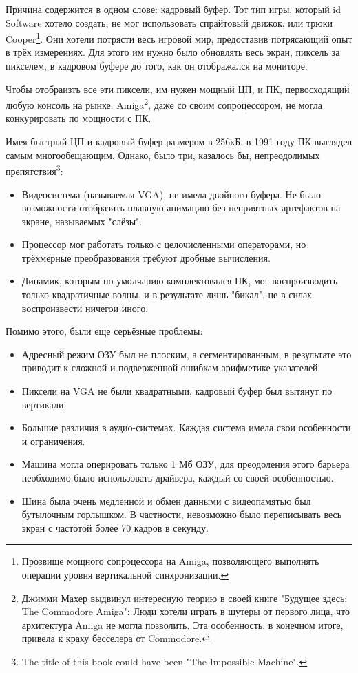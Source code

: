 Причина содержится в одном слове: кадровый буфер. Тот тип игры, который id Software хотело создать, не мог использовать спрайтовый движок, или трюки Cooper\footnote{Прозвище мощного сопроцессора на Amiga, позволяющего выполнять операции уровня вертикальной синхронизации.}. Они хотели потрясти весь игровой мир, предоставив потрясающий опыт в трёх измерениях. Для этого им нужно было обновлять весь экран, пиксель за пикселем, в кадровом буфере до того, как он отображался на мониторе.\\
\par
Чтобы отобраизть все эти пиксели, им нужен мощный ЦП, и ПК, первосходящий любую консоль на рынке. Amiga\footnote{Джимми Махер выдвинул интересную теорию в своей книге "Будущее здесь: The Commodore Amiga": Люди хотели играть в шутеры от первого лица, что архитектура Amiga не могла позволить. Эта особенность, в конечном итоге, привела к краху бесселера от Commodore.}, даже со своим сопроцессором, не могла конкурировать по мощности с ПК.
\par


 
Имея быстрый ЦП и кадровый буфер размером в 256кБ, в 1991 году ПК выглядел самым многообещающим. Однако, было три, казалось бы, непреодолимых препятствия\footnote{The title of this book could have been "The Impossible Machine".}:
\begin{itemize}
\item Видеосистема (называемая VGA), не имела двойного буфера. Не было возможности отобразить плавную анимацию без неприятных артефактов на экране, называемых "слёзы".
\item Процессор мог работать только с целочисленными операторами, но трёхмерные преобразования требуют дробные вычисления.
\item Динамик, которым по умолчанию комплектовался ПК, мог воспроизводить только квадратичные волны, и в результате лишь "бикал", не в силах воспроизвести ничегои иного.
\end{itemize}
Помимо этого, были еще серьёзные проблемы:
\begin{itemize}
\item Адресный режим ОЗУ был не плоским, а сегментированным, в результате это приводит к сложной и подверженной ошибкам арифметике указателей.
\item Пиксели на VGA не были квадратными, кадровый буфер был вытянут по вертикали.
\item Большие различия в аудио-системах. Каждая система имела свои особенности и ограничения.
\item Машина могла оперировать только 1 Мб ОЗУ, для преодоления этого барьера необходимо было использовать драйвера, каждый со своей особенностью.
\item Шина была очень медленной и обмен данными с видеопамятью был бутылочным горлышком. В частности, невозможно было переписывать весь экран с частотой более 70 кадров в секунду.
\end{itemize}

